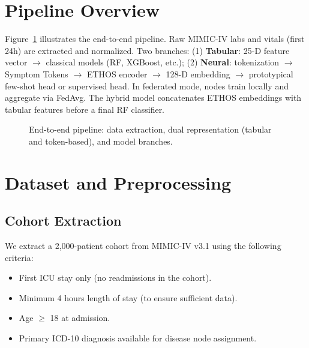 \section{Pipeline Overview}

Figure~\ref{fig:pipeline} illustrates the end-to-end pipeline. Raw MIMIC-IV labs and vitals (first 24h) are extracted and normalized. Two branches: (1) \textbf{Tabular}: 25-D feature vector $\to$ classical models (RF, XGBoost, etc.); (2) \textbf{Neural}: tokenization $\to$ Symptom Tokens $\to$ ETHOS encoder $\to$ 128-D embedding $\to$ prototypical few-shot head or supervised head. In federated mode, nodes train locally and aggregate via FedAvg. The hybrid model concatenates ETHOS embeddings with tabular features before a final RF classifier.

\begin{figure}[htbp]
\centering
{}
\caption{End-to-end pipeline: data extraction, dual representation (tabular and token-based), and model branches.}
\label{fig:pipeline}
\end{figure}

\section{Dataset and Preprocessing}

\subsection{Cohort Extraction}

We extract a 2,000-patient cohort from MIMIC-IV v3.1 using the following criteria:
\begin{itemize}
\item First ICU stay only (no readmissions in the cohort).
\item Minimum 4 hours length of stay (to ensure sufficient data).
\item Age $\geq$ 18 at admission.
\item Primary ICD-10 diagnosis available for disease node assignment.
\end{itemize}

